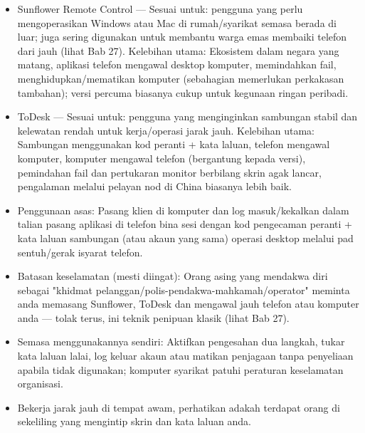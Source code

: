 \begin{itemize}
  \item Sunflower Remote Control — Sesuai untuk: pengguna yang perlu mengoperasikan Windows atau Mac di rumah/syarikat semasa berada di luar; juga sering digunakan untuk membantu warga emas membaiki telefon dari jauh (lihat Bab 27). Kelebihan utama: Ekosistem dalam negara yang matang, aplikasi telefon mengawal desktop komputer, memindahkan fail, menghidupkan/mematikan komputer (sebahagian memerlukan perkakasan tambahan); versi percuma biasanya cukup untuk kegunaan ringan peribadi.
  \item ToDesk — Sesuai untuk: pengguna yang menginginkan sambungan stabil dan kelewatan rendah untuk kerja/operasi jarak jauh. Kelebihan utama: Sambungan menggunakan kod peranti + kata laluan, telefon mengawal komputer, komputer mengawal telefon (bergantung kepada versi), pemindahan fail dan pertukaran monitor berbilang skrin agak lancar, pengalaman melalui pelayan nod di China biasanya lebih baik.
  \item Penggunaan asas: Pasang klien di komputer dan log masuk/kekalkan dalam talian pasang aplikasi di telefon bina sesi dengan kod pengecaman peranti + kata laluan sambungan (atau akaun yang sama) operasi desktop melalui pad sentuh/gerak isyarat telefon.
  \item Batasan keselamatan (mesti diingat): Orang asing yang mendakwa diri sebagai "khidmat pelanggan/polis-pendakwa-mahkamah/operator" meminta anda memasang Sunflower, ToDesk dan mengawal jauh telefon atau komputer anda — tolak terus, ini teknik penipuan klasik (lihat Bab 27).
  \item Semasa menggunakannya sendiri: Aktifkan pengesahan dua langkah, tukar kata laluan lalai, log keluar akaun atau matikan penjagaan tanpa penyeliaan apabila tidak digunakan; komputer syarikat patuhi peraturan keselamatan organisasi.
  \item Bekerja jarak jauh di tempat awam, perhatikan adakah terdapat orang di sekeliling yang mengintip skrin dan kata laluan anda.
\end{itemize}


